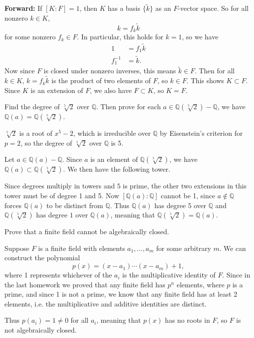 \documentclass[10pt]{report}
\begin{document}
\textbf{Forward:} If $[K:F]=1$, then $K$ has a basis $\{ \tilde{k} \}$ as an $F$-vector space. So for all nonzero $k \in K$,
\[
k = f_k \tilde{k}
\] for some nonzero $f_k \in F$. In particular, this holds for $k=1$, so we have
\begin{align*}
	1 &= f_1\tilde{k} \\
	f_1^{-1}&=\tilde{k}.
\end{align*}
Now since $F$ is closed under nonzero inverses, this means $\tilde{k} \in F$. Then for all $k \in K$, $k = f_k \tilde{k}$ is the product of two elements of $F$, so $k \in F$. This shows $K \subset F$. Since $K$ is an extension of $F$, we also have $F \subset K$, so $K=F$.

\begin{exer}[]
	Find the degree of $\sqrt[5]{2} $ over $\mathbb{Q}$. Then prove for each $a \in \mathbb{Q}(\sqrt[5]{2}) - \mathbb{Q}$, we have $\mathbb{Q}(a) = \mathbb{Q}(\sqrt[5]{2})$.
\end{exer}
$\sqrt[5]{2} $ is a root of $x^5-2$, which is irreducible over $\mathbb{Q}$ by Eisenstein's criterion for $p=2$, so the degree of $\sqrt[5]{2} $ over $\mathbb{Q}$ is 5.

Let $a \in \mathbb{Q}(a) - \mathbb{Q}$. Since $a$ is an element of $\mathbb{Q}(\sqrt[5]{2} )$, we have $\mathbb{Q}(a) \subset \mathbb{Q}(\sqrt[5]{2} )$. We then have the following tower.
\begin{center}
\end{center}
Since degrees multiply in towers and $5$ is prime, the other two extensions in this tower must be of degree 1 and 5. Now $[\mathbb{Q}(a):\mathbb{Q}]$ cannot be 1, since $a \not\in \mathbb{Q}$ forces $\mathbb{Q}(a)$ to be distinct from $\mathbb{Q}$. Thus $\mathbb{Q}(a)$ has degree 5 over $\mathbb{Q}$ and $\mathbb{Q}(\sqrt[5]{2} )$ has degree $1$ over $\mathbb{Q}(a)$, meaning that $\mathbb{Q}(\sqrt[5]{2} )=\mathbb{Q}(a)$.

\newpage
\begin{exer}[]
	Prove that a finite field cannot be algebraically closed.
\end{exer}
Suppose $F$ is a finite field with elements $a_1, \dots, a_m$ for some arbitrary $m$. We can construct the polynomial
\[
	p(x) = (x-a_1) \cdots (x-a_m) + 1,
\] where 1 represents whichever of the $a_i$ is the multiplicative identity of $F$. Since in the last homework we proved that any finite field has $p^n$ elements, where $p$ is a prime, and since 1 is not a prime, we know that any finite field has at least 2 elements, i.e. the multiplicative and additive identities are distinct.

Thus $p(a_i) =1 \neq 0$ for all $a_i$, meaning that $p(x)$ has no roots in $F$, so $F$ is not algebraically closed.
\end{document}
